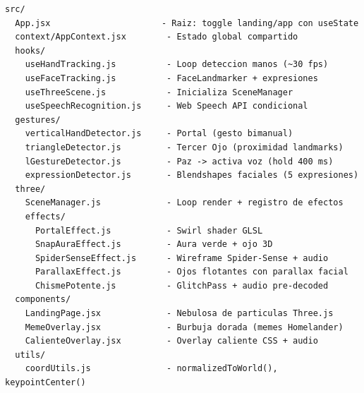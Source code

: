 \documentclass[11pt]{article}
\begin{document}
\begin{verbatim}
src/
  App.jsx                      - Raiz: toggle landing/app con useState
  context/AppContext.jsx        - Estado global compartido
  hooks/
    useHandTracking.js          - Loop deteccion manos (~30 fps)
    useFaceTracking.js          - FaceLandmarker + expresiones
    useThreeScene.js            - Inicializa SceneManager
    useSpeechRecognition.js     - Web Speech API condicional
  gestures/
    verticalHandDetector.js     - Portal (gesto bimanual)
    triangleDetector.js         - Tercer Ojo (proximidad landmarks)
    lGestureDetector.js         - Paz -> activa voz (hold 400 ms)
    expressionDetector.js       - Blendshapes faciales (5 expresiones)
  three/
    SceneManager.js             - Loop render + registro de efectos
    effects/
      PortalEffect.js           - Swirl shader GLSL
      SnapAuraEffect.js         - Aura verde + ojo 3D
      SpiderSenseEffect.js      - Wireframe Spider-Sense + audio
      ParallaxEffect.js         - Ojos flotantes con parallax facial
      ChismePotente.js          - GlitchPass + audio pre-decoded
  components/
    LandingPage.jsx             - Nebulosa de particulas Three.js
    MemeOverlay.jsx             - Burbuja dorada (memes Homelander)
    CalienteOverlay.jsx         - Overlay caliente CSS + audio
  utils/
    coordUtils.js               - normalizedToWorld(), keypointCenter()
\end{verbatim}
\end{document}

